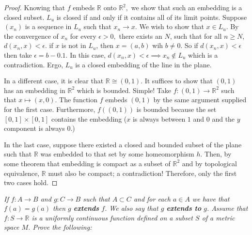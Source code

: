 \documentclass[letter]{article}
\newenvironment{menumerate}{%
  \edef\backupindent{\the\parindent}%
  \enumerate%
  \setlength{\parindent}{\backupindent}%
}{\endenumerate}
\begin{document}
\begin{menumerate}
\begin{proof}
				Knowing that $f$ embeds $\mathbb{R}$ onto $\mathbb{R}^2,$ we show that such an embedding is a closed subset. $L_u$ is closed if and only if it contains all of its limit points. Suppose $(x_n)$ is a sequence in $L_u$ such that $x_n \to x$. We wish to show that $x \in L_u.$ By the convergence of $x_n$ for every $\epsilon > 0,$ there exists an $N$, such that for all $n \geq N$, $d(x_n, x) < \epsilon.$ if $x$ is not in $L_u$, then $x = (a,b)$ wih $b \neq 0.$ So if $d(x_n,x) < \epsilon$ then take $\epsilon = b - 0.1.$ In this case, $d(x_n,x) < \epsilon \implies x_n \notin L_u$ which is a contradiction. Ergo, $L_u$ is a closed embedding of the line in the plane.

				In a different case, it is clear that $\mathbb{R} \cong (0,1).$ It suffices to show that $(0,1)$ has an embedding in $\mathbb{R}^2$ which is bounded. Simple! Take $f: (0,1) \to \mathbb{R}^2$ such that $x\mapsto (x,0).$ The function $f$ embeds $(0,1)$ by the same argument supplied for the first case. Furthermore, $f((0,1))$ is bounded because the set $[0,1]\times[0,1]$ contains the embedding ($x$ is always between $1$ and $0$ and the $y$ component is always $0$.) 

				In the last case, suppose there existed a closed and bounded subset of the plane such that $\mathbb{R}$ was embedded to that set by some homeomorphism $h$. Then, by some theorem that embedding is compact as a subset of $\mathbb{R}^2$ and by topological equivalence, $\mathbb{R}$ must also be compact; a contradiction! Therefore, only the first two cases hold.
			\end{proof}

		\setcounter{enumi}{53}
		\item \emph{If $f: A \to B$ and $g: C \to B$ such that $A \subset C$ and for each $a \in A$ we have that $f(a) = g(a)$ then $g$ \textbf{extends} $f$. We also say that $g$ \textbf{extends to} $g$. Assume that $f: S \to \mathbb{R}$ is a uniformly continuous function defined on a subset $S$ of a metric space $M$. Prove the following:}


\end{menumerate}
\end{document}
